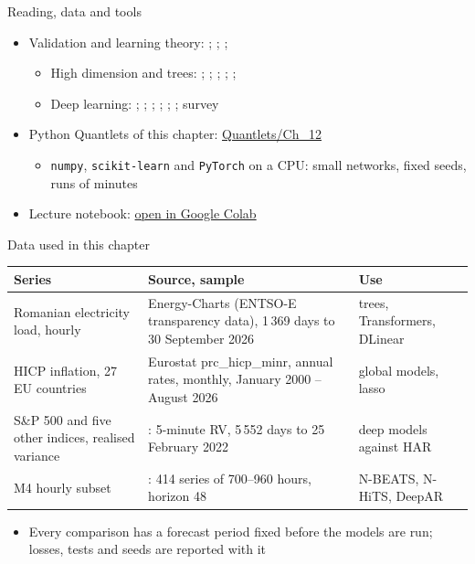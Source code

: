 \begin{frame}{Reading, data and tools}
\itemsize{\small}
\begin{itemize}
    \item Validation and learning theory: ; ; ; 
    \begin{itemize}
        \item High dimension and trees: ; ; ; ; ; 
        \item Deep learning: ; ; ; ; ; ; survey 
    \end{itemize}
    \item Python Quantlets of this chapter: \href{https://github.com/danpele/Advanced-Time-Series/tree/main/Quantlets/Ch_12}{Quantlets/Ch\_12}
    \begin{itemize}
        \item \texttt{numpy}, \texttt{scikit-learn} and \texttt{PyTorch} on a CPU: small networks, fixed seeds, runs of minutes
    \end{itemize}
    \item Lecture notebook: \href{\colaburl{notebooks/EN/chapter12_lecture_notebook.ipynb}}{open in Google Colab}
\end{itemize}
\end{frame}

\begin{frame}{Data used in this chapter}
\itemsize{\footnotesize}
\begin{center}
\scriptsize
\begin{tabular}{>{\raggedright\arraybackslash}p{3.0cm}>{\raggedright\arraybackslash}p{5.6cm}>{\raggedright\arraybackslash}p{3.6cm}}
\toprule
\textbf{Series} & \textbf{Source, sample} & \textbf{Use} \\
\midrule
Romanian electricity load, hourly & Energy-Charts (ENTSO-E transparency data), 1\,369 days to 30 September 2026 & trees, Transformers, DLinear \\
HICP inflation, 27 EU countries & Eurostat prc\_hicp\_minr, annual rates, monthly, January 2000 -- August 2026 & global models, lasso \\
S\&P 500 and five other indices, realised variance & : 5-minute RV, 5\,552 days to 25 February 2022 & deep models against HAR \\
M4 hourly subset & : 414 series of 700--960 hours, horizon 48 & N-BEATS, N-HiTS, DeepAR \\
\bottomrule
\end{tabular}
\end{center}
\begin{itemize}
    \item Every comparison has a forecast period fixed before the models are run; losses, tests and seeds are reported with it
\end{itemize}
\end{frame}

